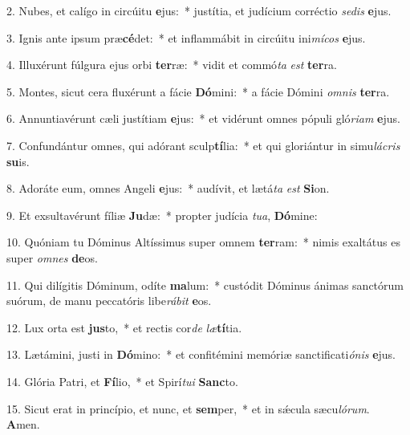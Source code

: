 2. Nubes, et calígo in circúitu \textbf{e}jus:~*  justítia, et judícium corréctio \textit{se}\textit{dis} \textbf{e}jus.\

3. Ignis ante ipsum præ\textbf{cé}det:~*  et inflammábit in circúitu ini\textit{mí}\textit{cos} \textbf{e}jus.\

4. Illuxérunt fúlgura ejus orbi \textbf{ter}ræ:~*  vidit et commó\textit{ta} \textit{est} \textbf{ter}ra.\

5. Montes, sicut cera fluxérunt a fácie \textbf{Dó}mini:~*  a fácie Dómini \textit{om}\textit{nis} \textbf{ter}ra.\

6. Annuntiavérunt cæli justítiam \textbf{e}jus:~*  et vidérunt omnes pópuli gló\textit{ri}\textit{am} \textbf{e}jus.\

7. Confundántur omnes, qui adórant sculp\textbf{tí}lia:~*  et qui gloriántur in simu\textit{lá}\textit{cris} \textbf{su}is.\

8. Adoráte eum, omnes Angeli \textbf{e}jus:~*  audívit, et lætá\textit{ta} \textit{est} \textbf{Si}on.\

9. Et exsultavérunt fíliæ \textbf{Ju}dæ:~*  propter judícia \textit{tu}\textit{a}, \textbf{Dó}mine:\

10. Quóniam tu Dóminus Altíssimus super omnem \textbf{ter}ram:~*  nimis exaltátus es super \textit{om}\textit{nes} \textbf{de}os.\

11. Qui dilígitis Dóminum, odíte \textbf{ma}lum:~*  custódit Dóminus ánimas sanctórum suórum, de manu peccatóris libe\textit{rá}\textit{bit} \textbf{e}os.\

12. Lux orta est \textbf{jus}to,~*  et rectis cor\textit{de} \textit{læ}\textbf{tí}tia.\

13. Lætámini, justi in \textbf{Dó}mino:~*  et confitémini memóriæ sanctificati\textit{ó}\textit{nis} \textbf{e}jus.\

14. Glória Patri, et \textbf{Fí}lio,~*  et Spirí\textit{tu}\textit{i} \textbf{Sanc}to.\

15. Sicut erat in princípio, et nunc, et \textbf{sem}per,~*  et in sǽcula sæcu\textit{ló}\textit{rum}. \textbf{A}men.\

